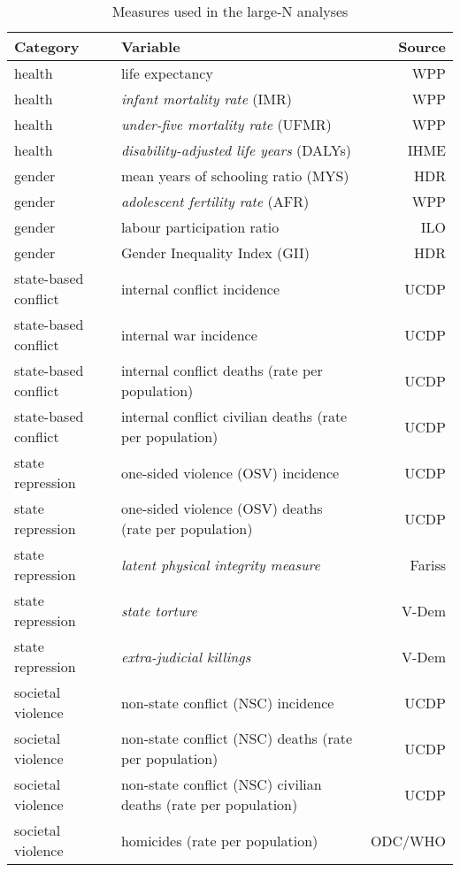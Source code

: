 \begin{table}[!htb]
\centering
\caption{Measures used in the large-N analyses}
\label{table_vars}
\begin{tabular}{llr}
\toprule
Category             & Variable                                                       & Source  \\
\midrule
health               & life expectancy                                                & WPP     \\
health               & \textit{infant mortality rate} (IMR)                           & WPP     \\
health               & \textit{under-five mortality rate} (UFMR)                      & WPP     \\
health               & \textit{disability-adjusted life years} (DALYs)                & IHME    \\
gender               & mean years of schooling ratio (MYS)                            & HDR     \\
gender               & \textit{adolescent fertility rate} (AFR)                       & WPP     \\
gender               & labour participation ratio                                     & ILO     \\
gender               & Gender Inequality Index (GII)                                  & HDR     \\
state-based conflict & internal conflict incidence                                    & UCDP    \\
state-based conflict & internal war incidence                                         & UCDP    \\
state-based conflict & internal conflict deaths (rate per population)                 & UCDP    \\
state-based conflict & internal conflict civilian deaths (rate per population)        & UCDP    \\
state repression     & one-sided violence (OSV) incidence                             & UCDP    \\
state repression     & one-sided violence (OSV) deaths (rate per population)          & UCDP    \\
state repression     & \textit{latent physical integrity measure}                     & Fariss  \\
state repression     & \textit{state torture}                                         & V-Dem   \\
state repression     & \textit{extra-judicial killings}                               & V-Dem   \\
societal violence    & non-state conflict (NSC) incidence                             & UCDP    \\
societal violence    & non-state conflict (NSC) deaths (rate per population)          & UCDP    \\
societal violence    & non-state conflict (NSC) civilian deaths (rate per population) & UCDP    \\
societal violence    & homicides (rate per population)                                & ODC/WHO \\
\bottomrule
\end{tabular}
\end{table}
